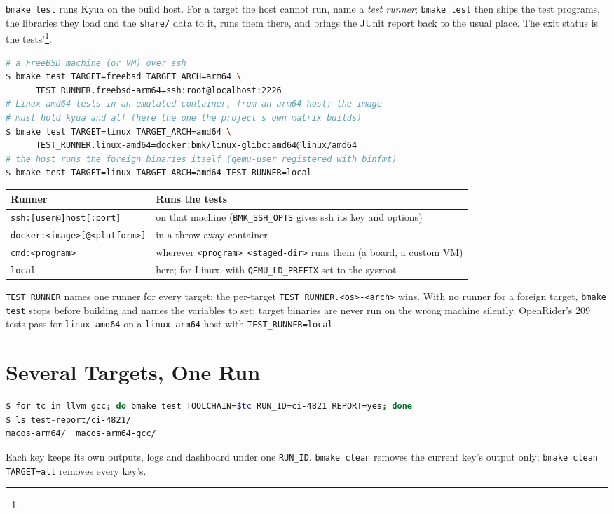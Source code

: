 \documentclass[11pt]{report}
\newcommand{\reqfoot}[1]{\footnote{\footnotesize\seqsplit{#1}}}
\begin{document}
\verb|bmake test| runs Kyua on the build host. For a target the host
cannot run, name a \emph{test runner}; \verb|bmake test| then ships the
test programs, the libraries they load and the \verb|share/| data to it,
runs them there, and brings the JUnit report back to the usual place.
The exit status is the tests'\reqfoot{REQ-cross-test-runner-req}.
\begin{lstlisting}[language=bash]
# a FreeBSD machine (or VM) over ssh
$ bmake test TARGET=freebsd TARGET_ARCH=arm64 \
      TEST_RUNNER.freebsd-arm64=ssh:root@localhost:2226
# Linux amd64 tests in an emulated container, from an arm64 host; the image
# must hold kyua and atf (here the one the project's own matrix builds)
$ bmake test TARGET=linux TARGET_ARCH=amd64 \
      TEST_RUNNER.linux-amd64=docker:bmk/linux-glibc:amd64@linux/amd64
# the host runs the foreign binaries itself (qemu-user registered with binfmt)
$ bmake test TARGET=linux TARGET_ARCH=amd64 TEST_RUNNER=local
\end{lstlisting}
\begin{center}
\begin{tabular}{ll}
\toprule
Runner & Runs the tests \\
\midrule
\verb|ssh:[user@]host[:port]| & on that machine (\verb|BMK_SSH_OPTS| gives ssh its key and options) \\
\verb|docker:<image>[@<platform>]| & in a throw-away container \\
\verb|cmd:<program>| & wherever \verb|<program> <staged-dir>| runs them (a board, a custom VM) \\
\verb|local| & here; for Linux, with \verb|QEMU_LD_PREFIX| set to the sysroot \\
\bottomrule
\end{tabular}
\end{center}
\verb|TEST_RUNNER| names one runner for every target; the per-target
\verb|TEST_RUNNER.<os>-<arch>| wins. With no runner for a foreign
target, \verb|bmake test| stops before building and names the variables
to set: target binaries are never run on the wrong machine silently.
OpenRider's 209 tests pass for \verb|linux-amd64| on a
\verb|linux-arm64| host with \verb|TEST_RUNNER=local|.

\section{Several Targets, One Run}

\begin{lstlisting}[language=bash]
$ for tc in llvm gcc; do bmake test TOOLCHAIN=$tc RUN_ID=ci-4821 REPORT=yes; done
$ ls test-report/ci-4821/
macos-arm64/  macos-arm64-gcc/
\end{lstlisting}
Each key keeps its own outputs, logs and dashboard under one
\verb|RUN_ID|. \verb|bmake clean| removes the current key's output only;
\verb|bmake clean TARGET=all| removes every key's.
\end{document}
